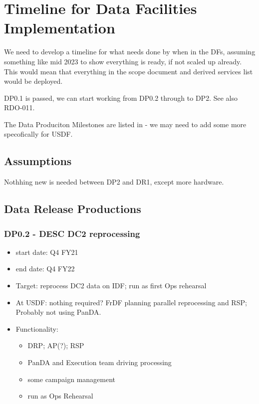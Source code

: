 
\section{Timeline for Data Facilities Implementation}\label{sec:timeline}

We need to develop a timeline for what needs done by when in the DFs, assuming something like mid 2023 to show everything is ready, if not scaled up already.
This would mean that everything in the scope document and derived services list would be deployed.

DP0.1 is passed,  we can start working from DP0.2  through to \gls{DP2}.
See also RDO-011.

The Data Produciton Milestones are listed in  - we may need to add some more specofically for \gls{USDF}.


\subsection{Assumptions}

Nothhing new is needed between \gls{DP2} and DR1, except more hardware.

\subsection{Data \gls{Release} Productions}
\subsubsection{ DP0.2 - \gls{DESC} DC2 reprocessing}
\begin{itemize}
\item start date: Q4 \gls{FY21}
\item end date: Q4 FY22
\item Target: reprocess \gls{DC2} data on IDF; run as first Ops rehearsal
\item At \gls{USDF}: nothing required? FrDF planning parallel reprocessing and RSP; Probably not using PanDA.
\item Functionality:
\begin{itemize}
\item \gls{DRP}; AP(?); RSP
\item \gls{PanDA} and Execution team driving processing
\item some campaign management
\item run as Ops Rehearsal
\end{itemize}
\end{itemize}
